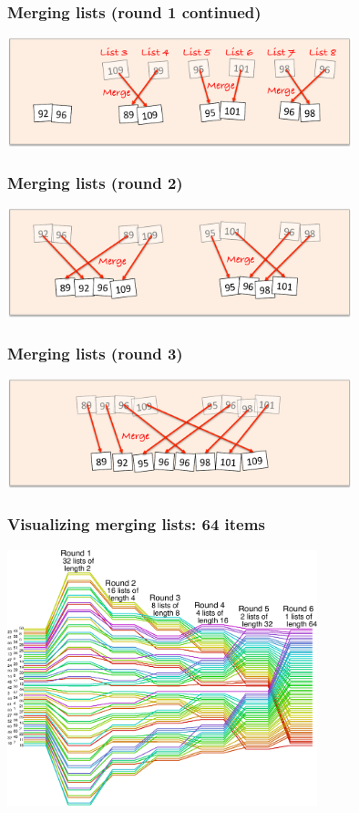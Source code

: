\documentclass{beamer} %
\begin{document}
\begin{frame}
  \frametitle{Merging lists (round 1 continued)}
  \centering
  \includegraphics[width=100mm]{assets/merge-move11-crop.pdf}
\end{frame}

\begin{frame}
  \frametitle{Merging lists (round 2)}
  \centering
  \includegraphics[width=100mm]{assets/merge-move12-crop.pdf}
\end{frame}

\begin{frame}
  \frametitle{Merging lists (round 3)}
  \centering
  \includegraphics[width=100mm]{assets/merge-move13-crop.pdf}
\end{frame}

\begin{frame}
  \frametitle{Visualizing merging lists: 64 items}
  \centering
  \includegraphics[width=90mm]{assets/mergesort.pdf}
\end{frame}
\end{document}
